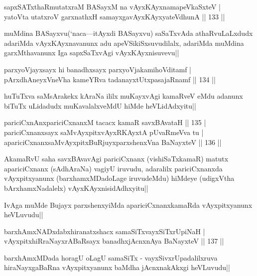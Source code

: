 \begin{shl}
sapxSATxthaRmutatxraM BASayxM na vAyxKAyxnamapeVkaSxteV |\\
yatoV\s ta utatxroV garxnathxH samayxgavAyxKAyxyateV\s dhunA \hfill || 133 ||
\end{shl}

\begin{artha}
muMdina BASayxvu(`naca---itAyxdi BASayxvu) saSaTxvAda athaRvuLaLxdudx adariMda vAyxKAyxnavanunx adu apeVSikiSxsuvudilalx, adariMda muMdina garxMthavanunx Iga sapxSaTxvAgi vAyxKAyxnisuvevu||	
\end{artha}

\begin{shl}
parxyoVjayxsayx hi banadhxsayx parxyoVjakamihoVditamf |\\
pArxdhAneyxVneVha kameYRva tadanayxtUtxpasajaRnamf \hfill || 134 ||
\end{shl}

\begin{artha}
huTuTxva saMsArakekx kAraNa ililx muKayxvAgi kamaRveV eMdu adanunx biTuTx uLidadudx muKavalalxveMdU hiMde heVLidAdxyitu||
\end{artha}

\begin{shl}
pariciCxnAnxpariciCxnanxM tacacx kamaR savxBAvataH \hfill || 135 |\\
pariciCxnanxsayx saMvAyxpitxvAyxRKAyxtA pUvaRmeVva tu |\\
apariciCxnanxsaMvAyxpitxBuRjuyxparxshenxVna BaNayxteV \hfill || 136 ||
\end{shl}

\begin{artha}
AkamaRvU saha savxBAvavAgi pariciCxnanx (vishiSaTxkamaR) matutx apariciCxnanx (sAdhAraNa) vagiyU iruvudu, adaralilx pariciCxnanxda vAyxpitxyanunx (barxhamxMDadoLage iruvudeMdu) hiMdeye (udigxVtha bArxhamxNadalelx) vAyxKAyxnisidAdhxyitu||
\end{artha}

\begin{artha}
IvAga muMde Bujayx parxshenxyiMda apariciCxnanxkamaRda vAyxpitxyanunx heVLuvudu||
\end{artha}

\begin{shl}
barxhAmxNADxdabxhiranatxshacx samaSiTxvayxSiTxrUpiNaH |\\
vAyxpitxhiRraNayxrABaRsayx banadhxjAcnxnAya BaNayxteV \hfill || 137 ||
\end{shl}

\begin{artha}
barxhAmxMDada horagU oLagU samaSiTx - vayxSivxrUpadalilxruva hiraNayxgaBaRna vAyxpitxyanunx baMdha jAcnxnakAkxgi heVLuvudu||
\end{artha}

